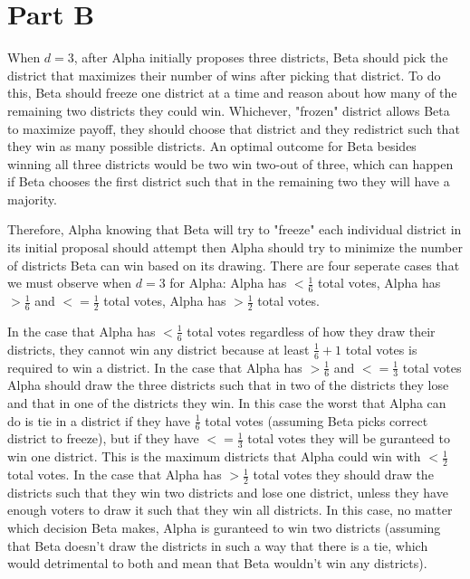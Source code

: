 \documentclass[12pt]{article}%
\begin{document}
\section*{Part B}

When $d=3$, after Alpha initially proposes three districts, Beta should pick the district that maximizes their number of wins after picking that district.  To do this, Beta should freeze one district at a time and reason about how many of the remaining two districts they could win.  Whichever, "frozen" district allows Beta to maximize payoff, they should choose that district and they redistrict such that they win as many possible districts.  An optimal outcome for Beta besides winning all three districts would be two win two-out of three, which can happen if Beta chooses the first district such that in the remaining two they will have a majority.

Therefore, Alpha knowing that Beta will try to "freeze" each individual district in its initial proposal should attempt then Alpha should try to minimize the number of districts Beta can win based on its drawing.  There are four seperate cases that we must observe when $d=3$ for Alpha: Alpha has $<\frac{1}{6}$ total votes, Alpha has $>\frac{1}{6}$ and $<=\frac{1}{2}$ total votes, Alpha has $>\frac{1}{2}$ total votes.

In the case that Alpha has $<\frac{1}{6}$ total votes regardless of how they draw their districts, they cannot win any district because at least $\frac{1}{6} + 1$ total votes is required to win a district.
In the case that Alpha has $>\frac{1}{6}$ and $<=\frac{1}{3}$ total votes Alpha should draw the three districts such that in two of the districts they lose and that in one of the districts they win.  In this case the worst that Alpha can do is tie in a district if they have $\frac{1}{6}$ total votes (assuming Beta picks correct district to freeze), but if they have $<=\frac{1}{3}$ total votes they will be guranteed to win one district.  This is the maximum districts that Alpha could win with $<\frac{1}{2}$ total votes.
In the case that Alpha has $>\frac{1}{2}$ total votes they should draw the districts such that they win two districts and lose one district, unless they have enough voters to draw it such that they win all districts.  In this case, no matter which decision Beta makes, Alpha is guranteed to win two districts (assuming that Beta doesn't draw the districts in such a way that there is a tie, which would detrimental to both and mean that Beta wouldn't win any districts).  
\end{document}
